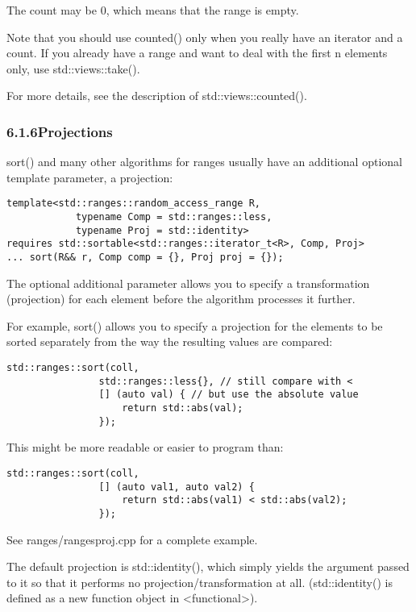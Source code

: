 The count may be 0, which means that the range is empty.

Note that you should use counted() only when you really have an iterator and a count. If you already have a range and want to deal with the first n elements only, use std::views::take().

For more details, see the description of std::views::counted().

\subsubsection*{ 6.1.6\hspace{0.2cm}Projections}

sort() and many other algorithms for ranges usually have an additional optional template parameter, a projection:

\begin{lstlisting}[style=styleCXX]
template<std::ranges::random_access_range R,
			typename Comp = std::ranges::less,
			typename Proj = std::identity>
requires std::sortable<std::ranges::iterator_t<R>, Comp, Proj>
... sort(R&& r, Comp comp = {}, Proj proj = {});
\end{lstlisting}

The optional additional parameter allows you to specify a transformation (projection) for each element before the algorithm processes it further.

For example, sort() allows you to specify a projection for the elements to be sorted separately from the way the resulting values are compared:

\begin{lstlisting}[style=styleCXX]
std::ranges::sort(coll,
				std::ranges::less{}, // still compare with <
				[] (auto val) { // but use the absolute value
					return std::abs(val);
				});
\end{lstlisting}

This might be more readable or easier to program than:

\begin{lstlisting}[style=styleCXX]
std::ranges::sort(coll,
				[] (auto val1, auto val2) {
					return std::abs(val1) < std::abs(val2);
				});
\end{lstlisting}

See ranges/rangesproj.cpp for a complete example.

The default projection is std::identity(), which simply yields the argument passed to it so that it performs no projection/transformation at all. (std::identity() is defined as a new function object in <functional>).

